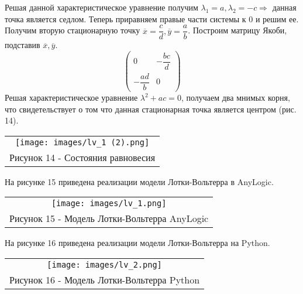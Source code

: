 Решая данной характеристическое уравнение получим $\lambda_1=a, \lambda_2=-c\Rightarrow$ данная точка является седлом.
Теперь приравняем правые части системы к 0 и решим ее. Получим вторую стационарную точку $\overline{x}=\dfrac{c}{d},
\overline{y}=\dfrac{a}{b}$. Построим матрицу Якоби, подставив $\overline{x},\overline{y}$.
\begin{equation}
  \begin{pmatrix}
    0&-\dfrac{bc}{d}\\-\dfrac{ad}{b}&0
  \end{pmatrix}
\end{equation}
Решая характеристическое уравнение $\lambda^2+ac=0$, получаем два мнимых корня, что свидетельствует о том что данная
стационарная точка является центром (рис. 14).
\begin{center}
  \begin{tabular}{c}
    \texttt{[image: images/lv\_1 (2).png]}\\
    Рисунок 14 - Состояния равновесия
  \end{tabular}
\end{center}
На рисунке 15 приведена реализации модели Лотки-Вольтерра в AnyLogic.
\begin{center}
  \begin{tabular}{c}
    \texttt{[image: images/lv\_1.png]}\\
    Рисунок 15 - Модель Лотки-Вольтерра AnyLogic
  \end{tabular}
\end{center}
На рисунке 16 приведена реализации модели Лотки-Вольтерра на Python.
\begin{center}
  \begin{tabular}{c}
    \texttt{[image: images/lv\_2.png]}\\
    Рисунок 16 - Модель Лотки-Вольтерра Python
  \end{tabular}
\end{center}

